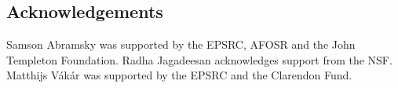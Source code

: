 \documentclass[runningheads,a4paper]{llncs}
\begin{document}
\subsection*{Acknowledgements}
\vspace{-3pt}
Samson Abramsky was supported by the EPSRC, AFOSR and the John Templeton Foundation.
Radha Jagadeesan acknowledges support from the NSF. Matthijs V\'ak\'ar was supported by the EPSRC and the Clarendon Fund.

\scriptsize


\end{document}
